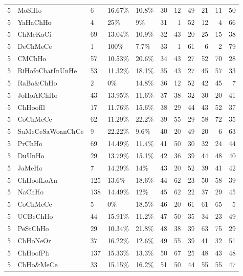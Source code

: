 \begin{longtable}{lllllrrrrrr}
  5 & MoSiHo & 6 & 16.67\% & 10.8\% &  30 &  12 &  49 &  21 &  11 &  50 \\ 
  5 & YaHaChHo & 4 & 25\% & 9\% &  31 &   1 &  52 &  12 &   4 &  66 \\ 
  5 & ChMeKaCi & 69 & 13.04\% & 10.9\% &  32 &  43 &  20 &  25 &  15 &  38 \\ 
  5 & DeChMeCe & 1 & 100\% & 7.7\% &  33 &   1 &  61 &   6 &   2 &  79 \\ 
  5 & CMChHo & 57 & 10.53\% & 20.6\% &  34 &  43 &  27 &  52 &  70 &  28 \\ 
  5 & RiHofoChatInUnHe & 53 & 11.32\% & 18.1\% &  35 &  43 &  27 &  45 &  57 &  33 \\ 
  5 & RaBa\&ChHo & 2 & 0\% & 14.8\% &  36 &  12 &  52 &  42 &  45 &   7 \\ 
  5 & JoHoAlChHo & 43 & 13.95\% & 11.6\% &  37 &  38 &  32 &  30 &  20 &  41 \\ 
  5 & ChHoofIl & 17 & 11.76\% & 15.6\% &  38 &  29 &  44 &  43 &  52 &  37 \\ 
  5 & CoChMeCe & 62 & 11.29\% & 22.2\% &  39 &  55 &  29 &  58 &  72 &  35 \\ 
  5 & SuMeCeSaWoanChCe & 9 & 22.22\% & 9.6\% &  40 &  20 &  49 &  20 &   6 &  63 \\ 
  5 & PrChHo & 69 & 14.49\% & 11.4\% &  41 &  50 &  30 &  32 &  24 &  44 \\ 
  5 & DuUnHo & 29 & 13.79\% & 15.1\% &  42 &  36 &  39 &  44 &  48 &  40 \\ 
  5 & JaMeHo & 7 & 14.29\% & 14\% &  43 &  20 &  52 &  39 &  41 &  42 \\ 
  5 & ChHoofLoAn & 125 & 13.6\% & 18.6\% &  44 &  62 &  23 &  50 &  58 &  39 \\ 
  5 & NaChHo & 138 & 14.49\% & 12\% &  45 &  62 &  22 &  37 &  29 &  45 \\ 
  5 & CoChMeCe & 5 & 0\% & 18.5\% &  46 &  20 &  61 &  61 &  65 &   5 \\ 
  5 & UCBeChHo & 44 & 15.91\% & 11.2\% &  47 &  50 &  35 &  34 &  23 &  49 \\ 
  5 & PeStChHo & 29 & 10.34\% & 21.8\% &  48 &  38 &  39 &  63 &  75 &  29 \\ 
  5 & ChHoNeOr & 37 & 16.22\% & 12.6\% &  49 &  55 &  39 &  41 &  32 &  51 \\ 
  5 & ChHoofPh & 137 & 15.33\% & 13.3\% &  50 &  67 &  25 &  48 &  43 &  48 \\ 
  5 & ChHo\&MeCe & 33 & 15.15\% & 16.2\% &  51 &  50 &  44 &  55 &  55 &  47 \\ 

\end{longtable}
